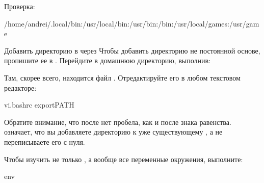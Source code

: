 \documentclass[letterpaper,10pt,russian]{sphinxmanual}
\begin{document}
\sphinxAtStartPar
Проверка:

\begin{sphinxVerbatim}[commandchars=\\\{\}]
/home/andrei/.local/bin:/usr/local/bin:/usr/bin:/bin:/usr/local/games:/usr/game
\end{sphinxVerbatim}

\sphinxAtStartPar
Добавить директорию в  через 
Чтобы добавить директорию не постоянной основе, пропишите ее в .
Перейдите в домашнюю директорию, выполнив:

\begin{sphinxVerbatim}[commandchars=\\\{\}]
\PYGZti{}
\end{sphinxVerbatim}

\sphinxAtStartPar
Там, скорее всего, находится файл . Отредактируйте его в любом текстовом редакторе:

\begin{sphinxVerbatim}[commandchars=\\\{\}]
vi.bashrc
exportPATH
\end{sphinxVerbatim}

\sphinxAtStartPar
Обратите внимание, что после  нет пробела, как и после знака равенства.
 означает, что вы добавляете директорию  к уже существующему , а не переписываете его с нуля.

\sphinxAtStartPar
{}
Чтобы изучить не только , а вообще все переменные окружения, выполните:

\begin{sphinxVerbatim}[commandchars=\\\{\}]
env
\end{sphinxVerbatim}
\end{document}
